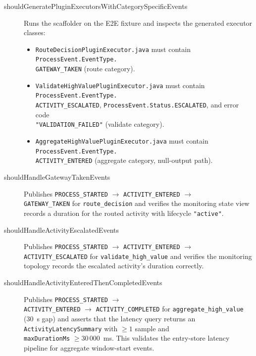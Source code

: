 \begin{description}

\item[shouldGeneratePluginExecutorsWithCategorySpecificEvents] Runs the
scaffolder on the E2E fixture and inspects the generated executor classes:
\begin{itemize}
\item \texttt{RouteDecisionPluginExecutor.java} must contain
\texttt{ProcessEvent.EventType.\\GATEWAY\_TAKEN} (route category).
\item \texttt{ValidateHighValuePluginExecutor.java} must contain
\texttt{ProcessEvent.EventType.\\ACTIVITY\_ESCALATED},
\texttt{ProcessEvent.Status.ESCALATED}, and error code \\
\texttt{"VALIDATION\_FAILED"} (validate category).
\item \texttt{AggregateHighValuePluginExecutor.java} must contain
\texttt{ProcessEvent.EventType.\\ACTIVITY\_ENTERED} (aggregate category,
null-output path).
\end{itemize}

\item[shouldHandleGatewayTakenEvents] Publishes
\texttt{PROCESS\_STARTED} $\to$ \texttt{ACTIVITY\_ENTERED} $\to$ \\
\texttt{GATEWAY\_TAKEN} for \texttt{route\_decision} and verifies the
monitoring state view records a duration for the routed activity with
lifecycle \texttt{"active"}.

\item[shouldHandleActivityEscalatedEvents] Publishes
\texttt{PROCESS\_STARTED} $\to$ \texttt{ACTIVITY\_ENTERED} $\to$
\texttt{ACTIVITY\_ESCALATED} for \texttt{validate\_high\_value} and
verifies the monitoring topology records the escalated activity's
duration correctly.

\item[shouldHandleActivityEnteredThenCompletedEvents] Publishes
\texttt{PROCESS\_STARTED} $\to$ \\ \texttt{ACTIVITY\_ENTERED} $\to$
\texttt{ACTIVITY\_COMPLETED} for \texttt{aggregate\_high\_value} (30~s
gap) and asserts that the latency query returns an
\texttt{ActivityLatencySummary} with $\ge 1$ sample and \\
\texttt{maxDurationMs} $\ge 30\,000$~ms. This validates the entry-store
latency pipeline for aggregate window-start events.


\end{description}

